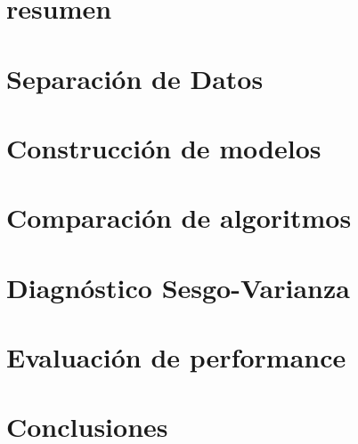 \documentclass{./packages/informe}
\begin{document}
 



\section*{resumen}


\vspace{1em}
\tableofcontents
\newpage

\section{Separación de Datos}


\section{Construcción de modelos}


\vspace{1em}
\section{Comparación de algoritmos}


\vspace{1em}
\section{Diagnóstico Sesgo-Varianza}


\vspace{1em}
\section{Evaluación de performance}


\vspace{1em}
\section{Conclusiones}


% 

% 
% 
\end{document}
